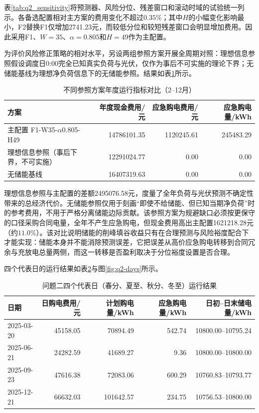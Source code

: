 表\ref{tab:q2_sensitivity}将预测器、风险分位、残差窗口和滚动时域的试验统一列示。各备选配置相对主方案的费用变化不超过$0.35\%$；其中$H$的小幅变化影响最小，F2替换F1仅增加2741.23元，而较低分位和较短残差窗口会明显增加费用。因此采用F1、$W=35$、$\alpha=0.805$和$H=49$作为主配置。

为评价风险修正策略的相对水平，另设两组参照方案开展全周期对照：理想信息参照假设调度日0:00完全已知真实负荷与光伏，仅作为事后不可实施的理论下界；无储能基线为理想净负荷信息下的无储能参照。结果如表\ref{tab:q2_baseline_compare}所示。

\begin{table}[htbp]
\centering
\caption{不同参照方案年度运行指标对比（2--12月）}
\label{tab:q2_baseline_compare}
\scriptsize
\begin{tabular}{lrrr}
\toprule
方案 & 年度现金费用/元 & 应急购电费用/元 & 应急购电量/kWh \\
\midrule
主配置 F1-W35-$\alpha$0.805-H49 & 14786101.35 & 1120245.61 & 245483.29 \\
理想信息参照（事后下界，不可实施） & 12291024.77 & 0.00 & 0.00 \\
无储能基线 & 16407319.63 & 0.00 & 0.00 \\
\bottomrule
\end{tabular}
\end{table}

理想信息参照与主配置的差额2495076.58元，度量了全年负荷与光伏预测不确定性带来的总经济代价。无储能参照仅用于刻画“即使不给储能、但已知当期净负荷”时的参考费用，不用于严格分离储能边际贡献。该参照方案为规避缺口必须按更保守的口径采购合同电量，全年不产生应急购电，但现金费用高出主配置1621218.28元（约$11.0\%$）。该对比说明储能的削峰填谷收益只有在合理预测与风险裕度配合下才能实现：储能本身并不能消除预测误差，它把误差从高价应急购电转移到合同冗余与充放电总量两侧，而这一转移是否盈利取决于分位裕度设置是否合理。

四个代表日的运行结果如表\ref{tab:q2_repday}与图\ref{fig:q2-days}所示。

\begin{table}[htbp]
\centering
\caption{问题二四个代表日（春分、夏至、秋分、冬至）运行结果}
\label{tab:q2_repday}
\scriptsize
\begin{tabular}{lrrrr}
\toprule
日期 & 日购电费用/元 & 计划购电量/kWh & 应急购电量/kWh & 日初--日末储电量/kWh \\
\midrule
2025-03-20 & 45158.05 & 70894.49 & 542.74 & 10800.00--10795.24 \\
2025-06-21 & 24282.59 & 41689.27 & 9.36 & 10800.00--10800.00 \\
2025-09-23 & 47616.38 & 72083.06 & 600.29 & 10760.83--10793.77 \\
2025-12-21 & 66632.03 & 101642.57 & 234.75 & 10756.53--10800.00 \\
\bottomrule
\end{tabular}
\end{table}

